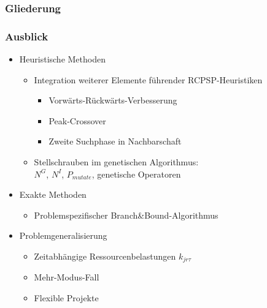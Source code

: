 \begin{frame}
\frametitle{Gliederung}
\tableofcontents[current] %
\end{frame}

\begin{frame}
\frametitle{Ausblick}
\begin{itemize}
\item Heuristische Methoden
	\begin{itemize}
	\item Integration weiterer Elemente führender RCPSP-Heuristiken
		\begin{itemize}
		\item Vorwärts-Rückwärts-Verbesserung
		\item Peak-Crossover
		\item Zweite Suchphase in Nachbarschaft
		\end{itemize}
	\item Stellschrauben im genetischen Algorithmus:\\$N^G$, $N^I$, $P_{mutate}$, genetische Operatoren\\[4mm]
	\end{itemize}
	
\item Exakte Methoden
	\begin{itemize}\item Problemspezifischer Branch\&Bound-Algorithmus\\[4mm]\end{itemize}
	
\item Problemgeneralisierung
	\begin{itemize}
	\item Zeitabhängige Ressourcenbelastungen $k_{jr\tau}$
	\item Mehr-Modus-Fall
	\item Flexible Projekte
	\end{itemize}
\end{itemize}
\end{frame}




